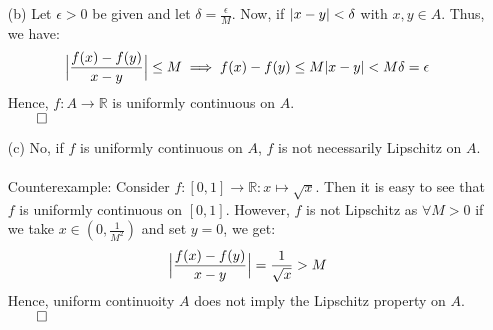 \documentclass[11pt]{article}
\DeclarePairedDelimiter\abs{\lvert}{\rvert}%
\DeclarePairedDelimiter\absb{\Big\lvert}{\Big\rvert}%
\newcommand{\reals}{\mathbb{R}}
\begin{document}
\begin{itemize}
\begin{itemize}
            \item[(b)]
                Let $\epsilon > 0$ be given and let $\delta =
                \frac{\epsilon}{M}$. Now, if $\abs{x - y} < \delta$ with $x, y
                \in A$. Thus, we have:
                \begin{equation*}
                    \absb{\frac{f(x) - f(y)}{x - y}} \leq M \implies f(x) -
                    f(y) \leq M\abs{x - y} < M\delta = \epsilon
                \end{equation*}
                Hence, $f : A \to \reals$ is uniformly continuous on $A$.\\
                $\qed$

            \item[(c)]
                No, if $f$ is uniformly continuous on $A$, $f$ is not
                necessarily Lipschitz on $A$.
                \\
                \\
                Counterexample:
                Consider $f : [0, 1] \to \reals : x \mapsto \sqrt{x}$. Then it
                is easy to see that $f$ is uniformly continuous on $[0, 1]$.
                However, $f$ is not Lipschitz as $\forall M > 0$ if we take
                $x \in (0, \frac{1}{M^2})$ and set $y = 0$, we get:
                \begin{equation*}
                    \absb{\frac{f(x) - f(y)}{x - y}} = \frac{1}{\sqrt{x}} > M
                \end{equation*}
                Hence, uniform continuoity $A$ does not imply the Lipschitz
                property on $A$.\\
                $\qed$
        \end{itemize}
\end{itemize}

\end{document}
